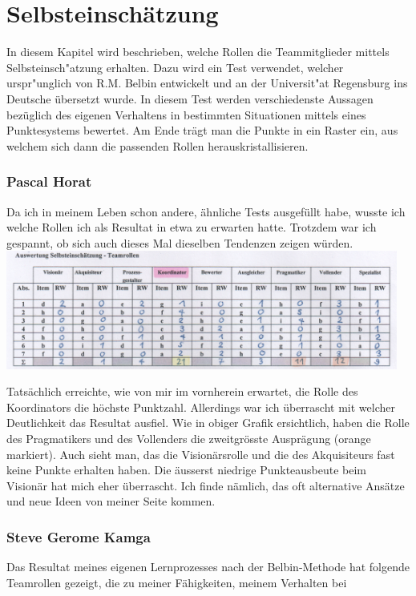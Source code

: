 
\chapter{Selbsteinschätzung}
In diesem Kapitel wird beschrieben, welche Rollen die Teammitglieder mittels Selbsteinsch"atzung erhalten. Dazu wird ein Test verwendet, welcher urspr"unglich von R.M. Belbin \cite{belbin1981management} entwickelt und an der Universit"at Regensburg ins Deutsche übersetzt wurde. In diesem Test werden verschiedenste Aussagen bezüglich des eigenen Verhaltens in bestimmten Situationen mittels eines Punktesystems bewertet. Am Ende trägt man die Punkte in ein Raster ein, aus welchem sich dann die passenden Rollen herauskristallisieren.

\subsection*{Pascal Horat}
Da ich in meinem Leben schon andere, ähnliche Tests ausgefüllt habe, wusste ich welche Rollen ich als Resultat in etwa zu erwarten hatte. Trotzdem war ich gespannt, ob sich auch dieses Mal dieselben Tendenzen zeigen würden. \\

\includegraphics[height=39mm]{images/SelbsteinschaetzungHorat.png}

Tatsächlich erreichte, wie von mir im vornherein erwartet, die Rolle des Koordinators die höchste Punktzahl. Allerdings war ich überrascht mit welcher Deutlichkeit das Resultat ausfiel. Wie in obiger Grafik ersichtlich, haben die Rolle des Pragmatikers und des Vollenders die zweitgrösste Ausprägung (orange markiert). Auch sieht man, das die Visionärsrolle und die des Akquisiteurs fast keine Punkte erhalten haben. Die äusserst niedrige Punkteausbeute beim Visionär hat mich eher überrascht. Ich finde nämlich, das oft alternative Ansätze und neue Ideen von meiner Seite kommen.

\subsection*{Steve Gerome Kamga}
Das Resultat meines eigenen Lernprozesses nach der Belbin-Methode hat folgende Teamrollen gezeigt, die zu meiner Fähigkeiten, 
meinem Verhalten bei

